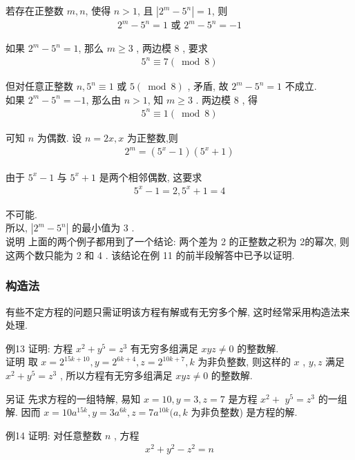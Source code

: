若存在正整数 $m ,  n$, 使得 $n>1$, 且 $\left|2^{m}-5^{n}\right|=1$, 则
\begin{align*}
	2^{m}-5^{n}=1 \text { 或 } 2^{m}-5^{n}=-1
\end{align*}

如果 $2^{m}-5^{n}=1$, 那么 $m \geqslant 3$ , 两边模 8 , 要求
\begin{align*}
	5^{n} \equiv 7(\bmod 8)
\end{align*}

但对任意正整数 $n, 5^{n} \equiv 1$ 或 $5(\bmod 8)$ , 矛盾, 故 $2^{m}-5^{n}=1$ 不成立. \\
如果 $2^{m}-5^{n}=-1$, 那么由 $n>1$, 知 $m \geqslant 3$ . 两边模 8 , 得
\begin{align*}
	5^{n} \equiv 1(\bmod 8)
\end{align*}

可知 $n$ 为偶数. 设 $n=2 x, x$ 为正整数,则
\begin{align*}
	2^{m}=\left(5^{x}-1\right)\left(5^{x}+1\right)
\end{align*}

由于 $5^{x}-1$ 与 $5^{x}+1$ 是两个相邻偶数, 这要求
\begin{align*}
	5^{x}-1=2,5^{x}+1=4
\end{align*}

不可能.\\
所以,  $\left|2^{m}-5^{n}\right|$ 的最小值为 3 . \\
说明 上面的两个例子都用到了一个结论: 两个差为 2 的正整数之积为 2的幂次, 则这两个数只能为 2 和 4 . 该结论在例 11 的前半段解答中已予以证明.

\subsubsection{构造法}
有些不定方程的问题只需证明该方程有解或有无穷多个解, 这时经常采用构造法来处理.

例13 证明: 方程 $x^{2}+y^{5}=z^{3}$ 有无穷多组满足 $x y z \neq 0$ 的整数解. \\
证明 取 $x=2^{15 k+10}, y=2^{6 k+4}, z=2^{10 k+7}, k$ 为非负整数, 则这样的 $x$ ,  $y ,  z$ 满足 $x^{2}+y^{5}=z^{3}$ , 所以方程有无穷多组满足 $x y z \neq 0$ 的整数解.

另证 先求方程的一组特解, 易知 $x=10 ,  y=3 ,  z=7$ 是方程 $x^{2}+$ $y^{5}=z^{3}$ 的一组解. 因而 $x=10 a^{15 k}, y=3 a^{6 k}, z=7 a^{10 k}(a, k$ 为非负整数) 是方程的解.

例14 证明: 对任意整数 $n$ , 方程
\begin{align*}
	x^{2}+y^{2}-z^{2}=n
\end{align*}

